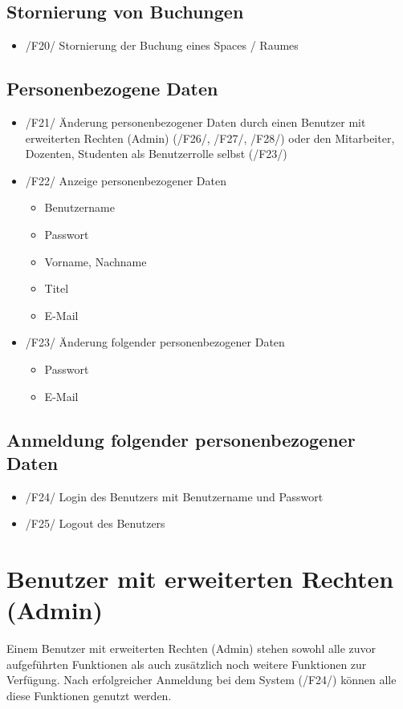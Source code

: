 \documentclass[a4paper,report,headsepline]{scrreprt}
\begin{document}
\subsection{Stornierung von Buchungen}
\begin{itemize}
\item /F20/ Stornierung der Buchung eines Spaces / Raumes
\end{itemize}

\subsection{Personenbezogene Daten}
\begin{itemize}
\item /F21/ Änderung personenbezogener Daten durch einen Benutzer mit erweiterten Rechten (Admin) (/F26/, /F27/, /F28/) oder den Mitarbeiter, Dozenten, Studenten als Benutzerrolle selbst (/F23/)
\item /F22/ Anzeige personenbezogener Daten
\begin{itemize}
\item Benutzername
\item Passwort
\item Vorname, Nachname
\item Titel
\item E-Mail
\end{itemize}

\item /F23/ Änderung folgender personenbezogener Daten

\begin{itemize}
\item Passwort
\item E-Mail

\end{itemize}
\end{itemize}

\subsection{Anmeldung folgender personenbezogener Daten}

\begin{itemize}
\item /F24/ Login des Benutzers mit Benutzername und Passwort
\item /F25/ Logout des Benutzers
\end{itemize}

\section{Benutzer mit erweiterten Rechten (Admin)}
Einem Benutzer mit erweiterten Rechten (Admin) stehen sowohl alle zuvor aufgeführten Funktionen als auch zusätzlich noch weitere Funktionen zur Verfügung. Nach erfolgreicher Anmeldung bei dem System (/F24/) können alle diese Funktionen genutzt werden.
\end{document}
